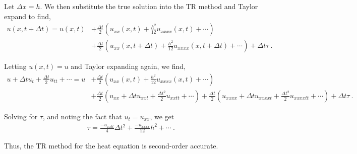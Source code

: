 
\begin{questions}


\begin{solution}

Let $\Delta x = h$. We then substitute the true solution into the TR method and Taylor expand to find,
\begin{align*}
u(x,t + \Delta t) = u(x,t) &+ \frac{\Delta t}{2}\left( u_{xx}(x,t) + \frac{h^2}{12}u_{xxxx}(x,t) + \cdots \right)\\
&+ \frac{\Delta t}{2}\left( u_{xx}(x,t + \Delta t) + \frac{h^2}{12}u_{xxxx}(x,t + \Delta t) + \cdots \right) + \Delta t \tau~.
\end{align*}

Letting $u(x,t) = u$ and Taylor expanding again, we find,
{\small
\begin{align*}
u + \Delta t u_t + \frac{\Delta t}{2}u_{tt} + \cdots = u &+ \frac{\Delta t}{2} \left(u_{xx}(x,t) + \frac{h^2}{12}u_{xxxx}(x,t) + \cdots \right) \\
& +\frac{\Delta t}{2}\left(u_{xx} + \Delta t u_{xxt} + \frac{\Delta t^2}{2}u_{xxtt} + \cdots \right) + \frac{\Delta t}{2}\left(u_{xxxx} + \Delta t u_{xxxxt} + \frac{\Delta t^2}{2}u_{xxxxtt} + \cdots \right) + \Delta t \tau~.
\end{align*}}

Solving for $\tau$, and noting the fact that $u_t = u_{xx}$, we get
\begin{align*}
\tau = \frac{-u_{xxtt}}{4}\Delta t^2 + \frac{-u_{xxxx}}{12} h^2 + \cdots~.
\end{align*}

Thus, the TR method for the heat equation is second-order accurate.

\end{solution}

\end{questions}
